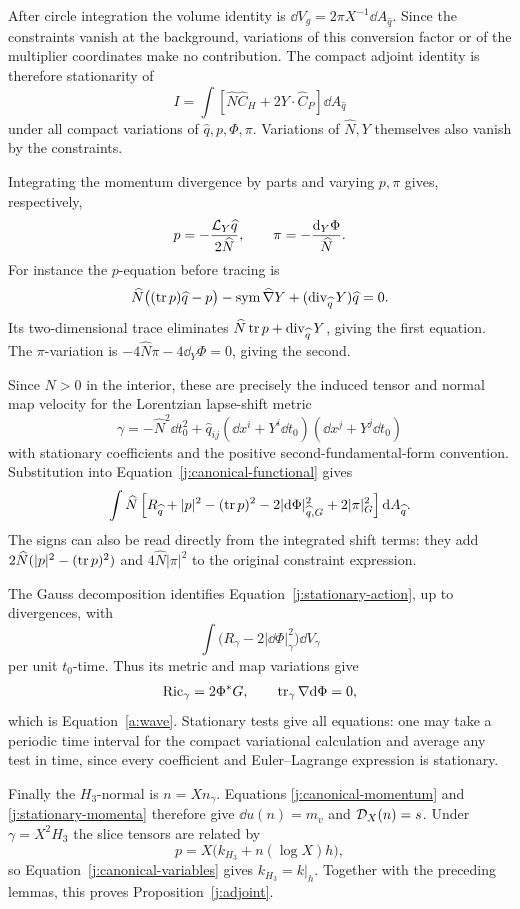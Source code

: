 After circle integration the volume identity is
\(\dd V_g=2\pi X^{-1}\dd A_{\widehat q}\). Since the constraints vanish
at the background, variations of this conversion factor or of the
multiplier coordinates make no contribution. The compact adjoint
identity is therefore stationarity of
\begin{equation}
\label{j:canonical-functional}
 I=\int\left[
      \widehat N\widehat C_H+2Y\cdot\widehat C_P
          \right]\dd A_{\widehat q}
\end{equation}
under all compact variations of
\(\widehat q,p,\Phi,\pi\). Variations of \(\widehat N,Y\) themselves
also vanish by the constraints.

Integrating the momentum divergence by parts and varying \(p,\pi\)
gives, respectively,
\begin{equation}
\label{j:stationary-momenta}
 p=-\frac{\mathcal L_Y\widehat q}{2\widehat N},
 \qquad
 \pi=-\frac{\mathrm d_Y\Phi}{\widehat N}.
\end{equation}
For instance the \(p\)-equation before tracing is
\[
 \widehat N\bigl((\operatorname{tr} p)\widehat q-p\bigr)
 -\operatorname{sym}\widehat\nabla Y
            +(\operatorname{div}_{\widehat q}Y)\widehat q=0.
\]
Its two-dimensional trace eliminates
\(\widehat N\operatorname{tr} p+\operatorname{div}_{\widehat q}Y\), giving the first equation.
The \(\pi\)-variation is
\(-4\widehat N\pi-4\dd_Y\Phi=0\), giving the second.

Since \(N>0\) in the interior, these are precisely the induced tensor
and normal map velocity for the Lorentzian lapse-shift metric
\[
 \gamma=-\widehat N^2\dd t_0^2+
  \widehat q_{ij}(\dd x^i+Y^i\dd t_0)(\dd x^j+Y^j\dd t_0)
\]
with stationary coefficients and the positive second-fundamental-form
convention. Substitution into Equation~\eqref{j:canonical-functional}
gives
\begin{equation}
\label{j:stationary-action}
 \int\widehat N\left[
 R_{\widehat q}+|p|^2-(\operatorname{tr} p)^2
           -2|\mathrm d\Phi|_{\widehat q,G}^2+2|\pi|_G^2
                        \right]\mathrm d A_{\widehat q}.
\end{equation}
The signs can also be read directly from the integrated shift terms:
they add \(2\widehat N(|p|^2-(\operatorname{tr} p)^2)\) and
\(4\widehat N|\pi|^2\) to the original constraint expression.

The Gauss decomposition identifies
Equation~\eqref{j:stationary-action}, up to divergences, with
\[
 \int\bigl(R_\gamma-2|\dd\Phi|_\gamma^2\bigr)\dd V_\gamma
\]
per unit \(t_0\)-time. Thus its metric and map variations give
\[
 \operatorname{Ric}_\gamma=2\Phi^*G,\qquad
 \operatorname{tr}_\gamma\nabla\mathrm d\Phi=0,
\]
which is Equation~\eqref{a:wave}. Stationary tests give all equations:
one may take a periodic time interval for the compact variational
calculation and average any test in time, since every coefficient and
Euler--Lagrange expression is stationary.

Finally the \(H_3\)-normal is \(n=Xn_\gamma\). Equations
\eqref{j:canonical-momentum} and \eqref{j:stationary-momenta} therefore
give \(\dd u(n)=m_v\) and \(\mathcal D_X(n)=s\).
Under \(\gamma=X^2H_3\) the slice tensors are related by
\[
 p=X\bigl(k_{H_3}+n(\log X)h\bigr),
\]
so Equation~\eqref{j:canonical-variables} gives \(k_{H_3}=k|_h\).
Together with the preceding lemmas, this proves
Proposition~\ref{j:adjoint}.
